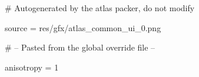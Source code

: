 # Autogenerated by the atlas packer, do not modify

source = res/gfx/atlas_common_ui_0.png

# -- Pasted from the global override file --

anisotropy = 1
